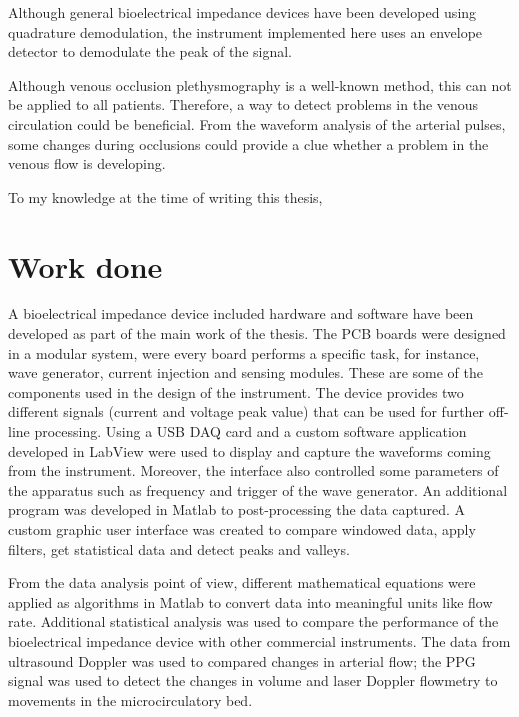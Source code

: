 Although general bioelectrical impedance devices have been developed using quadrature demodulation, the instrument implemented here uses an envelope detector to demodulate the peak of the signal.

Although venous occlusion plethysmography is a well-known method, this can not be applied to all patients. Therefore, a way to detect problems in the venous circulation could be beneficial. From the waveform analysis of the arterial pulses, some changes during occlusions could provide a clue whether a problem in the venous flow is developing.


To my knowledge at the time of writing this thesis,

\section{Work done}
A bioelectrical impedance device included hardware and software have been developed as part of the main work of the thesis. The PCB boards were designed in a modular system, were every board performs a specific task, for instance, wave generator, current injection and sensing modules. These are some of the components used in the design of the instrument. The device provides two different signals (current and voltage peak value) that can be used for further off-line processing. Using a USB DAQ card and a custom software application developed in LabView \cite{LabView:2016} were used to display and capture the waveforms coming from the instrument. Moreover, the interface also controlled some parameters of the apparatus such as frequency and trigger of the wave generator. An additional program was developed in Matlab \cite{MATLAB:2016} to post-processing the data captured. A custom graphic user interface was created to compare windowed data, apply filters, get statistical data and detect peaks and valleys.

From the data analysis point of view, different mathematical equations were applied as algorithms in Matlab to convert data into meaningful units like flow rate. Additional statistical analysis was used to compare the performance of the bioelectrical impedance device with other commercial instruments. The data from ultrasound Doppler was used to compared changes in arterial flow; the PPG signal was used to detect the changes in volume and laser Doppler flowmetry to movements in the microcirculatory bed.



